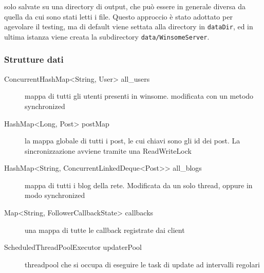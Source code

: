 solo salvate su una directory di output, che può essere in generale diversa da quella da cui sono stati letti i file. 
Questo approccio è stato adottato per agevolare il testing, ma di default viene settata alla directory in \verb|dataDir|, ed in ultima istanza viene creata la subdirectory \verb|data/WinsomeServer|.

\subsubsection{Strutture dati}

\begin{description}
	\item[ConcurrentHashMap<String, User> all\_users] mappa di tutti gli utenti presenti in winsome. modificata con un metodo synchronized
	\item[HashMap<Long, Post> postMap] la mappa globale di tutti i post, le cui chiavi sono gli id dei post. La sincronizzazione avviene tramite una ReadWriteLock
	\item[HashMap<String, ConcurrentLinkedDeque<Post>> all\_blogs] mappa di tutti i blog della rete. Modificata da un solo thread, oppure in modo synchronized
	\item[Map<String, FollowerCallbackState> callbacks] una mappa di tutte le callback registrate dai client
	\item[ScheduledThreadPoolExecutor updaterPool] threadpool che si occupa di eseguire le task di update ad intervalli regolari
\end{description}